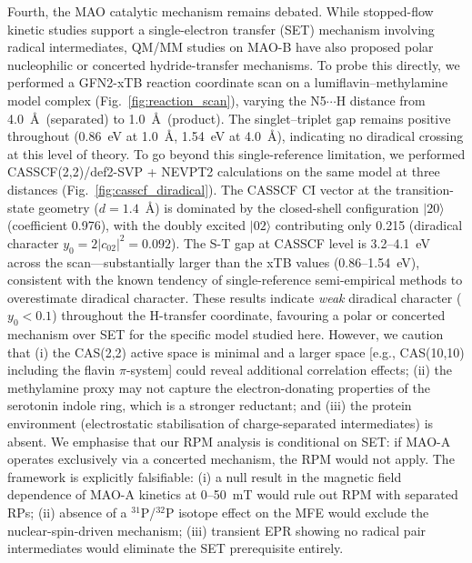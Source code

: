 \documentclass[11pt]{article}
\begin{document}
Fourth, the MAO catalytic mechanism remains debated. While stopped-flow kinetic studies support a single-electron transfer (SET) mechanism involving radical intermediates\cite{Ramsay1991}, QM/MM studies on MAO-B have also proposed polar nucleophilic or concerted hydride-transfer mechanisms\cite{Vianello2012}. To probe this directly, we performed a GFN2-xTB reaction coordinate scan on a lumiflavin--methylamine model complex (Fig.~\ref{fig:reaction_scan}), varying the N5$\cdots$H distance from 4.0~\AA\ (separated) to 1.0~\AA\ (product). The singlet--triplet gap remains positive throughout (0.86~eV at 1.0~\AA, 1.54~eV at 4.0~\AA), indicating no diradical crossing at this level of theory. To go beyond this single-reference limitation, we performed CASSCF(2,2)/def2-SVP + NEVPT2 calculations on the same model at three distances (Fig.~\ref{fig:casscf_diradical}). The CASSCF CI vector at the transition-state geometry ($d = 1.4$~\AA) is dominated by the closed-shell configuration $|20\rangle$ (coefficient 0.976), with the doubly excited $|02\rangle$ contributing only 0.215 (diradical character $y_0 = 2|c_{02}|^2 = 0.092$). The S-T gap at CASSCF level is 3.2--4.1~eV across the scan---substantially larger than the xTB values (0.86--1.54~eV), consistent with the known tendency of single-reference semi-empirical methods to overestimate diradical character. These results indicate \emph{weak} diradical character ($y_0 < 0.1$) throughout the H-transfer coordinate, favouring a polar or concerted mechanism over SET for the specific model studied here. However, we caution that (i) the CAS(2,2) active space is minimal and a larger space [e.g., CAS(10,10) including the flavin $\pi$-system] could reveal additional correlation effects; (ii) the methylamine proxy may not capture the electron-donating properties of the serotonin indole ring, which is a stronger reductant; and (iii) the protein environment (electrostatic stabilisation of charge-separated intermediates) is absent. We emphasise that our RPM analysis is conditional on SET: if MAO-A operates exclusively via a concerted mechanism, the RPM would not apply. The framework is explicitly falsifiable: (i) a null result in the magnetic field dependence of MAO-A kinetics at 0--50~mT would rule out RPM with separated RPs; (ii) absence of a $^{31}$P/$^{32}$P isotope effect on the MFE would exclude the nuclear-spin-driven mechanism; (iii) transient EPR showing no radical pair intermediates would eliminate the SET prerequisite entirely.
\end{document}
